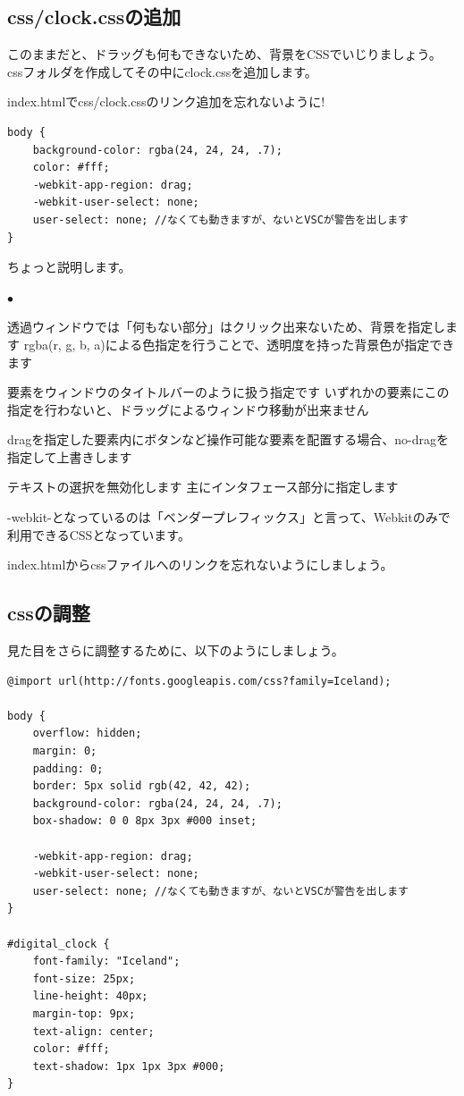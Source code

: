 \documentclass[mingoth,11pt,a4j,uplatex]{jsarticle}
\renewenvironment{description}%
{%
   \begin{list}{\parbox{1zw}{$\bullet$}}%
   {%
      \setlength{\topsep}{1zh}
      \setlength{\itemindent}{3zw}
      \setlength{\leftmargin}{5zw}%
      \setlength{\rightmargin}{0zw}%
      \setlength{\labelsep}{1zw}%
      \setlength{\labelwidth}{3zw}%
      \setlength{\itemsep}{0em}%
      \setlength{\parsep}{0em}%
      \setlength{\listparindent}{0zw}%
   }
}{%
   \end{list}%
}
\begin{document}
\subsection{css/clock.cssの追加}
このままだと、ドラッグも何もできないため、背景をCSSでいじりましょう。
cssフォルダを作成してその中にclock.cssを追加します。

index.htmlでcss/clock.cssのリンク追加を忘れないように!

\begin{lstlisting}[caption=DigitalClock：css/clock.css ]
body {
    background-color: rgba(24, 24, 24, .7);
    color: #fff;
    -webkit-app-region: drag;
    -webkit-user-select: none;
    user-select: none; //なくても動きますが、ないとVSCが警告を出します
}
\end{lstlisting}

ちょっと説明します。
\begin{description}
\item[背景色/背景画像]
透過ウィンドウでは「何もない部分」はクリック出来ないため、背景を指定します
rgba(r, g, b, a)による色指定を行うことで、透明度を持った背景色が指定できます
\item[-webkit-app-region: drag;]
要素をウィンドウのタイトルバーのように扱う指定です
いずれかの要素にこの指定を行わないと、ドラッグによるウィンドウ移動が出来ません
\item[-webkit-app-region: no-drag;]
dragを指定した要素内にボタンなど操作可能な要素を配置する場合、no-dragを指定して上書きします
\item[-webkit-user-select: none;]
テキストの選択を無効化します
主にインタフェース部分に指定します
\end{description}

-webkit-となっているのは「ベンダープレフィックス」と言って、Webkitのみで利用できるCSSとなっています。

index.htmlからcssファイルへのリンクを忘れないようにしましょう。
\subsection{cssの調整}
見た目をさらに調整するために、以下のようにしましょう。
\begin{lstlisting}[caption=DigitalClock：css/clock.css ]
@import url(http://fonts.googleapis.com/css?family=Iceland);

body {
    overflow: hidden;
    margin: 0;
    padding: 0;
    border: 5px solid rgb(42, 42, 42);
    background-color: rgba(24, 24, 24, .7);
    box-shadow: 0 0 8px 3px #000 inset;

    -webkit-app-region: drag;
    -webkit-user-select: none;
    user-select: none; //なくても動きますが、ないとVSCが警告を出します
}

#digital_clock {
    font-family: "Iceland";
    font-size: 25px;
    line-height: 40px;
    margin-top: 9px;
    text-align: center;
    color: #fff;
    text-shadow: 1px 1px 3px #000;
}
\end{lstlisting}
\end{document}
